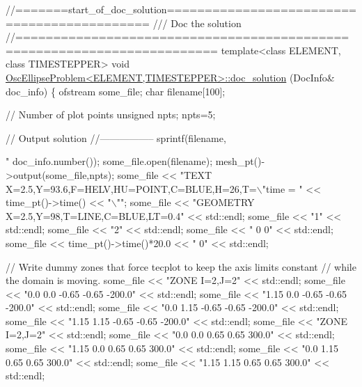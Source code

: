 \begin{DoxyCodeInclude}
\textcolor{comment}{//=======start\_of\_doc\_solution============================================}
\textcolor{comment}{/// Doc the solution}
\textcolor{comment}{}\textcolor{comment}{//========================================================================}
\textcolor{keyword}{template}<\textcolor{keyword}{class} ELEMENT, \textcolor{keyword}{class} TIMESTEPPER>
\textcolor{keywordtype}{void} \hyperlink{classOscEllipseProblem_afca2cc3e3e64ac764323f232cacc7e3b}{OscEllipseProblem<ELEMENT,TIMESTEPPER>::doc\_solution}
      (DocInfo& doc\_info)
\{ 
 ofstream some\_file;
 \textcolor{keywordtype}{char} filename[100];

 \textcolor{comment}{// Number of plot points}
 \textcolor{keywordtype}{unsigned} npts;
 npts=5;

 \textcolor{comment}{// Output solution }
 \textcolor{comment}{//-----------------}
 sprintf(filename,\textcolor{stringliteral}{"%
         doc\_info.number());
 some\_file.open(filename);
 mesh\_pt()->output(some\_file,npts);
 some\_file << \textcolor{stringliteral}{"TEXT X=2.5,Y=93.6,F=HELV,HU=POINT,C=BLUE,H=26,T=\(\backslash\)"time = "} 
           << time\_pt()->time() << \textcolor{stringliteral}{"\(\backslash\)""};
 some\_file << \textcolor{stringliteral}{"GEOMETRY X=2.5,Y=98,T=LINE,C=BLUE,LT=0.4"} << std::endl;
 some\_file << \textcolor{stringliteral}{"1"} << std::endl;
 some\_file << \textcolor{stringliteral}{"2"} << std::endl;
 some\_file << \textcolor{stringliteral}{" 0 0"} << std::endl;
 some\_file << time\_pt()->time()*20.0 << \textcolor{stringliteral}{" 0"} << std::endl;

 \textcolor{comment}{// Write dummy zones that force tecplot to keep the axis limits constant}
 \textcolor{comment}{// while the domain is moving.}
 some\_file << \textcolor{stringliteral}{"ZONE I=2,J=2"} << std::endl;
 some\_file << \textcolor{stringliteral}{"0.0 0.0 -0.65 -0.65 -200.0"} << std::endl;
 some\_file << \textcolor{stringliteral}{"1.15 0.0 -0.65 -0.65 -200.0"} << std::endl;
 some\_file << \textcolor{stringliteral}{"0.0 1.15 -0.65 -0.65 -200.0"} << std::endl;
 some\_file << \textcolor{stringliteral}{"1.15 1.15 -0.65 -0.65 -200.0"} << std::endl;
 some\_file << \textcolor{stringliteral}{"ZONE I=2,J=2"} << std::endl;
 some\_file << \textcolor{stringliteral}{"0.0 0.0 0.65 0.65 300.0"} << std::endl;
 some\_file << \textcolor{stringliteral}{"1.15 0.0 0.65 0.65 300.0"} << std::endl;
 some\_file << \textcolor{stringliteral}{"0.0 1.15 0.65 0.65 300.0"} << std::endl;
 some\_file << \textcolor{stringliteral}{"1.15 1.15 0.65 0.65 300.0"} << std::endl;

}
\end{DoxyCodeInclude}
